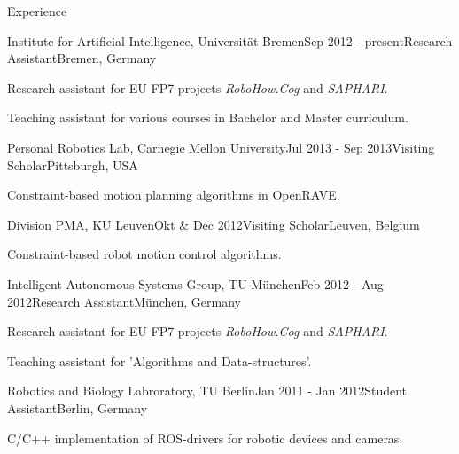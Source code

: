 \documentclass{resume} %
\begin{document}
\begin{rSection}{Experience}
	
\begin{rSubsection}{Institute for Artificial Intelligence, Universit\"at Bremen}{Sep 2012 - present}{Research Assistant}{Bremen, Germany}
  \item Research assistant for EU FP7 projects \textit{RoboHow.Cog} and \textit{SAPHARI}.
  \item Teaching assistant for various courses in Bachelor and Master curriculum.
\end{rSubsection}


\begin{rSubsection}{Personal Robotics Lab, Carnegie Mellon University}{Jul 2013 - Sep 2013}{Visiting Scholar}{Pittsburgh, USA}
  \item Constraint-based motion planning algorithms in OpenRAVE.
\end{rSubsection}


\begin{rSubsection}{Division PMA, KU Leuven}{Okt \& Dec 2012}{Visiting Scholar}{Leuven, Belgium}
  \item Constraint-based robot motion control algorithms.
\end{rSubsection}


\begin{rSubsection}{Intelligent Autonomous Systems Group, TU M\"unchen}{Feb 2012 - Aug 2012}{Research Assistant}{M\"unchen, Germany}
  \item Research assistant for EU FP7 projects \textit{RoboHow.Cog} and \textit{SAPHARI}.
  \item Teaching assistant for 'Algorithms and Data-structures'.
\end{rSubsection}


\begin{rSubsection}{Robotics and Biology Labroratory, TU Berlin}{Jan 2011 - Jan 2012}{Student Assistant}{Berlin, Germany}
  \item C/C++ implementation of ROS-drivers for robotic devices and cameras.
\end{rSubsection}



\end{rSection}
\end{document}
